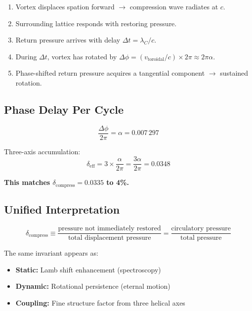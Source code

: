 \begin{enumerate}
  \item Vortex displaces spation forward $\to$ compression wave radiates at $c$.
  \item Surrounding lattice responds with restoring pressure.
  \item Return pressure arrives with delay $\Delta t = \lambda_C / c$.
  \item During $\Delta t$, vortex has rotated by $\Delta\phi = (v_{\text{toroidal}}/c) \times 2\pi \approx 2\pi\alpha$.
  \item Phase-shifted return pressure acquires a tangential component $\to$ sustained rotation.
\end{enumerate}

\subsection{Phase Delay Per Cycle}

\begin{equation}
  \frac{\Delta\phi}{2\pi} = \alpha = 0.007\,297
\end{equation}

Three-axis accumulation:
\begin{equation}
  \delta_{\text{eff}} = 3 \times \frac{\alpha}{2\pi} = \frac{3\alpha}{2\pi} = 0.0348
\end{equation}

\textbf{This matches $\delta_{\text{compress}} = 0.0335$ to 4\%.}

\subsection{Unified Interpretation}

\begin{equation}
  \delta_{\text{compress}} \equiv
    \frac{\text{pressure not immediately restored}}{\text{total displacement pressure}}
  = \frac{\text{circulatory pressure}}{\text{total pressure}}
\end{equation}

The same invariant appears as:
\begin{itemize}
  \item \textbf{Static:} Lamb shift enhancement (spectroscopy)
  \item \textbf{Dynamic:} Rotational persistence (eternal motion)
  \item \textbf{Coupling:} Fine structure factor from three helical axes
\end{itemize}


